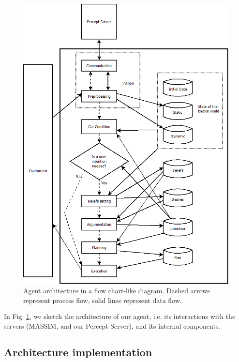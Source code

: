 \documentclass{llncs2e/llncs}
\begin{document}
\begin{figure}
\centering
  \includegraphics[width=\textwidth]{agent_architecture2.png}
    \caption{Agent architecture in a flow chart-like diagram. 
    Dashed arrows represent process flow, solid lines represent data flow.}
\label{fig:architecture}
\end{figure}

    In Fig. \ref{fig:architecture}, we sketch the architecture of our agent, 
    i.e. its interactions with the servers (MASSIM, and our Percept Server), 
    and its internal components.
 

\subsection{Architecture implementation}



\end{document}
